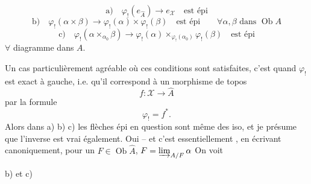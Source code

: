 
\[
\text{a)}\quad \varphi_!(e_{\widehat A})\longrightarrow e_{\mathcal X}\quad\text{est épi}
\]
\[
\text{b)}\quad \varphi_!(\alpha\times\beta)\longrightarrow
\varphi_!(\alpha)\times\varphi_!(\beta)\quad\text{est épi}
\qquad \forall\alpha,\beta\text{ dans }\operatorname{Ob}A
\]
\[
\text{c)}\quad \varphi_!(\alpha\times_{\alpha_0}\beta)\longrightarrow
\varphi_!(\alpha)\times_{\varphi_!(\alpha_0)}\varphi_!(\beta)\quad\text{est épi}
\]
$\forall$ diagramme
dans $A$.

Un cas particulièrement agréable où ces conditions sont satisfaites, c'est quand $\varphi_!$ est exact à gauche, i.e. qu'il correspond  à un morphisme de topos
\[
f:\mathcal X\longrightarrow\widehat A
\]
par la formule
\[
\varphi_!=f^*.
\]
Alors dans a) b) c) les flèches épi en question sont même des iso, et je présume que l'inverse est vrai également. Oui -- et c'est essentiellement , en écrivant canoniquement, pour un $F\in\operatorname{Ob}\widehat A$, $F=\varinjlim_{A/F}\alpha$ \unsure{$\ldots$} On voit

 b) et c)

